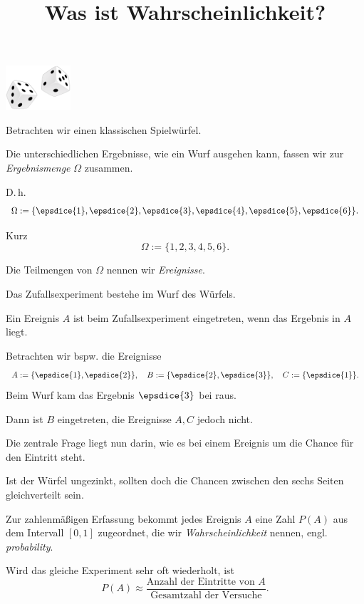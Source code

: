 \documentclass[9pt]{beamer}
\title{Was ist Wahrscheinlichkeit?}
\date{}
\newcommand{\parspace}{\vspace{0.8em}}
\newcommand\dice[1]{\vcenter{\hbox{\epsdice{#1}}}}
\begin{document}
\begin{frame}
\maketitle

\vspace{-8em}
\begin{center}
\includegraphics[width=24mm]{img/dices.pdf}
\end{center}

\end{frame}

\begin{frame}[t]
\vspace{4em}
Betrachten wir einen klassischen Spielwürfel.\pause

\vspace{0.8em}
Die unterschiedlichen Ergebnisse, wie ein Wurf ausgehen kann, fassen
wir zur \emph{Ergebnismenge} $\Omega$ zusammen.\pause

\vspace{1.2em}
D.\,h.
\[\Omega := \{\dice{1}, \dice{2}, \dice{3}, \dice{4}, \dice{5}, \dice{6}\}.
\]\pause

\vspace{0.4em}
Kurz
\[\Omega := \{1, 2, 3, 4, 5, 6\}.\]
\end{frame}

\begin{frame}
Die Teilmengen von $\Omega$ nennen wir \emph{Ereignisse}.\pause

\parspace
Das Zufallsexperiment bestehe im Wurf des Würfels.\pause

\begin{definition}
Ein Ereignis $A$ ist beim Zufallsexperiment eingetreten,
wenn das Ergebnis in $A$ liegt.
\end{definition}\pause
Betrachten wir bspw. die Ereignisse
\[A := \{\dice{1},\dice{2}\},\quad B := \{\dice{2},\dice{3}\},\quad C := \{\dice{1}\}.\]
Beim Wurf kam das Ergebnis $\dice{3}$ bei raus.\pause

\parspace
Dann ist $B$ eingetreten, die Ereignisse $A,C$ jedoch nicht.
\end{frame}

\begin{frame}
Die zentrale Frage liegt nun darin, wie es bei einem Ereignis
um die Chance für den Eintritt steht.\pause

\parspace
Ist der Würfel ungezinkt, sollten doch die Chancen zwischen den
sechs Seiten gleichverteilt sein.\pause

\parspace
Zur zahlenmäßigen Erfassung bekommt jedes Ereignis $A$ eine Zahl
$P(A)$ aus dem Intervall $[0,1]$ zugeordnet, die wir
\emph{Wahrscheinlichkeit} nennen, engl. \emph{probability}.\pause

\parspace
Wird das gleiche Experiment sehr oft wiederholt, ist
\[P(A) \approx \frac{\text{Anzahl der Eintritte von $A$}}{\text{Gesamtzahl der Versuche}}.\]
\end{frame}
\end{document}
